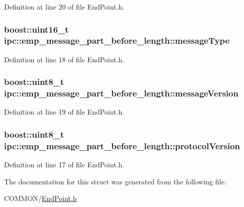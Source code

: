 Definition at line 20 of file End\+Point.\+h.

\subsubsection[{\texorpdfstring{message\+Type}{messageType}}]{\setlength{\rightskip}{0pt plus 5cm}boost\+::uint16\+\_\+t ipc\+::emp\+\_\+message\+\_\+part\+\_\+before\+\_\+length\+::message\+Type}\hypertarget{structipc_1_1emp__message__part__before__length_a48e0635345c37af793a98fcef9736b2b}{}\label{structipc_1_1emp__message__part__before__length_a48e0635345c37af793a98fcef9736b2b}


Definition at line 18 of file End\+Point.\+h.

\subsubsection[{\texorpdfstring{message\+Version}{messageVersion}}]{\setlength{\rightskip}{0pt plus 5cm}boost\+::uint8\+\_\+t ipc\+::emp\+\_\+message\+\_\+part\+\_\+before\+\_\+length\+::message\+Version}\hypertarget{structipc_1_1emp__message__part__before__length_a79751350900a0fa719f49e8423e3eee0}{}\label{structipc_1_1emp__message__part__before__length_a79751350900a0fa719f49e8423e3eee0}


Definition at line 19 of file End\+Point.\+h.

\subsubsection[{\texorpdfstring{protocol\+Version}{protocolVersion}}]{\setlength{\rightskip}{0pt plus 5cm}boost\+::uint8\+\_\+t ipc\+::emp\+\_\+message\+\_\+part\+\_\+before\+\_\+length\+::protocol\+Version}\hypertarget{structipc_1_1emp__message__part__before__length_a823b229981f8bf4aa504bad9eb71c8ad}{}\label{structipc_1_1emp__message__part__before__length_a823b229981f8bf4aa504bad9eb71c8ad}


Definition at line 17 of file End\+Point.\+h.



The documentation for this struct was generated from the following file\+:\begin{DoxyCompactItemize}
\item 
C\+O\+M\+M\+O\+N/\hyperlink{EndPoint_8h}{End\+Point.\+h}\end{DoxyCompactItemize}
